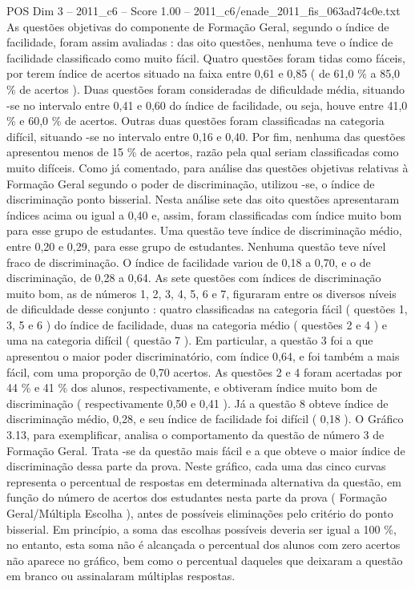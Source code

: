 \begin{textsample}{POS Dim 3 – 2011\_c6 – Score 1.00 – 2011\_c6/enade\_2011\_fis\_063ad74c0e.txt}
As questões objetivas do componente de Formação Geral, segundo o índice de facilidade, foram assim avaliadas : das oito questões, nenhuma teve o índice de facilidade classificado como muito fácil.
Quatro questões foram tidas como fáceis, por terem índice de acertos situado na faixa entre 0,61 e 0,85 ( de 61,0 \% a 85,0 \% de acertos ).
Duas questões foram consideradas de dificuldade média, situando -se no intervalo entre 0,41 e 0,60 do índice de facilidade, ou seja, houve entre 41,0 \% e 60,0 \% de acertos.
Outras duas questões foram classificadas na categoria difícil, situando -se no intervalo entre 0,16 e 0,40.
Por fim, nenhuma das questões apresentou menos de 15 \% de acertos, razão pela qual seriam classificadas como muito difíceis.
Como já comentado, para análise das questões objetivas relativas à Formação Geral segundo o poder de discriminação, utilizou -se, o índice de discriminação ponto bisserial.
Nesta análise sete das oito questões apresentaram índices acima ou igual a 0,40 e, assim, foram classificadas com índice muito bom para esse grupo de estudantes.
Uma questão teve índice de discriminação médio, entre 0,20 e 0,29, para esse grupo de estudantes.
Nenhuma questão teve nível fraco de discriminação.
O índice de facilidade variou de 0,18 a 0,70, e o de discriminação, de 0,28 a 0,64.
As sete questões com índices de discriminação muito bom, as de números 1, 2, 3, 4, 5, 6 e 7, figuraram entre os diversos níveis de dificuldade desse conjunto : quatro classificadas na categoria fácil ( questões 1, 3, 5 e 6 ) do índice de facilidade, duas na categoria médio ( questões 2 e 4 ) e uma na categoria difícil ( questão 7 ).
Em particular, a questão 3 foi a que apresentou o maior poder discriminatório, com índice 0,64, e foi também a mais fácil, com uma proporção de 0,70 acertos.
As questões 2 e 4 foram acertadas por 44 \% e 41 \% dos alunos, respectivamente, e obtiveram índice muito bom de discriminação ( respectivamente 0,50 e 0,41 ).
Já a questão 8 obteve índice de discriminação médio, 0,28, e seu índice de facilidade foi difícil ( 0,18 ).
O Gráfico 3.13, para exemplificar, analisa o comportamento da questão de número 3 de Formação Geral.
Trata -se da questão mais fácil e a que obteve o maior índice de discriminação dessa parte da prova.
Neste gráfico, cada uma das cinco curvas representa o percentual de respostas em determinada alternativa da questão, em função do número de acertos dos estudantes nesta parte da prova ( Formação Geral/Múltipla Escolha ), antes de possíveis eliminações pelo critério do ponto bisserial.
Em princípio, a soma das escolhas possíveis deveria ser igual a 100 \%, no entanto, esta soma não é alcançada o percentual dos alunos com zero acertos não aparece no gráfico, bem como o percentual daqueles que deixaram a questão em branco ou assinalaram múltiplas respostas.

\end{textsample}
